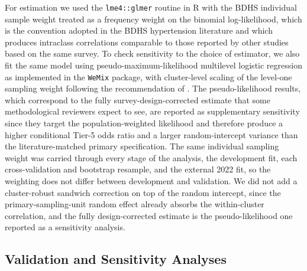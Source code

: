 \documentclass[
  12pt,
  a4paper]{article}
\begin{document}
For estimation we used the \texttt{lme4::glmer} routine in R with the BDHS individual sample weight treated as a frequency weight on the binomial log-likelihood, which is the convention adopted in the BDHS hypertension literature and which produces intraclass correlations comparable to those reported by other studies based on the same survey. To check sensitivity to the choice of estimator, we also fit the same model using pseudo-maximum-likelihood multilevel logistic regression as implemented in the \texttt{WeMix} package, with cluster-level scaling of the level-one sampling weight following the recommendation of \citet{rabe_hesketh_2006}. The pseudo-likelihood results, which correspond to the fully survey-design-corrected estimate that some methodological reviewers expect to see, are reported as supplementary sensitivity since they target the population-weighted likelihood and therefore produce a higher conditional Tier-5 odds ratio and a larger random-intercept variance than the literature-matched primary specification. The same individual sampling weight was carried through every stage of the analysis, the development fit, each cross-validation and bootstrap resample, and the external 2022 fit, so the weighting does not differ between development and validation. We did not add a cluster-robust sandwich correction on top of the random intercept, since the primary-sampling-unit random effect already absorbs the within-cluster correlation, and the fully design-corrected estimate is the pseudo-likelihood one reported as a sensitivity analysis.

\subsection{Validation and Sensitivity Analyses}\label{validation-and-sensitivity-analyses}
\end{document}
